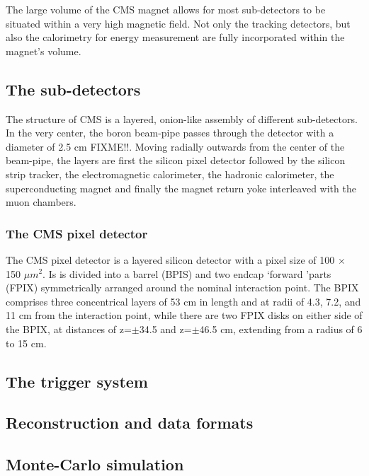 The large volume of the CMS magnet allows for most sub-detectors to be situated within a very high magnetic field. Not only the
tracking detectors, but also the calorimetry for energy measurement are fully incorporated within the magnet's volume.



\subsection{The sub-detectors}
\label{sub:cms_subdet}
The structure of CMS is a layered, onion-like assembly of different sub-detectors. In the very center, the boron beam-pipe
passes through the detector with a diameter of 2.5 cm FIXME!!. Moving radially outwards from the center of the beam-pipe,
the layers are first the silicon pixel detector followed by the silicon strip tracker, the electromagnetic calorimeter,
the hadronic calorimeter, the superconducting magnet and finally the magnet return yoke interleaved with the muon chambers.

\subsubsection*{The CMS pixel detector}
The CMS pixel detector is a layered silicon detector with a pixel size of 100 $\times$ 150 $\mu m^2$. Is is divided into
a barrel (BPIS) and two endcap `forward 'parts (FPIX) symmetrically arranged around the nominal interaction point. The BPIX comprises three
concentrical layers of 53 cm in length and at radii of \num{4.3}, \num{7.2}, and \num{11} cm from the interaction point, while there are two FPIX 
disks on either side of the BPIX, at distances of z=$\pm$\num{34.5} and z=$\pm$\num{46.5} cm, extending from a radius of \num{6} to 15 cm.

\subsection{The trigger system}
\label{sub:cms_trigger}
\subsection{Reconstruction and data formats}
\label{sub:cms_reco}
\subsection{Monte-Carlo simulation}
\label{sub:cms_mc}

